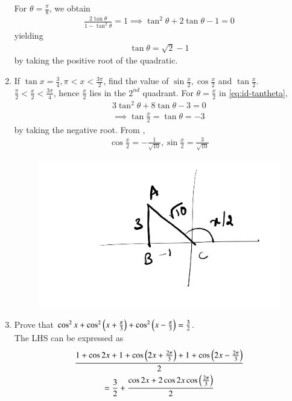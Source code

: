 \begin{enumerate}[label=\thesubsection.\arabic*,ref=\thesubsection.\theenumi,itemsep=1ex]
For $\theta = \frac{\pi}{8}$,  we obtain
\begin{align}
	 \frac{2\tan \theta}{1-\tan^2\theta}=1
	 \implies 
	{\tan^2\theta}+{2\tan \theta}- 1=0
\end{align}
yielding
\begin{align}
	\tan \theta = \sqrt{2}-1 
\end{align}
by taking the positive root of the quadratic.
%
\item If $\tan x=\frac{3}{4}, \pi<x<\frac{3\pi}{2}$, find the value of $\sin\frac{x}{2},\cos\frac{x}{2}$ and $\tan\frac{x}{2}$.
%
	\\
	\solution $ \frac{\pi}{2}<\frac{x}{2} <\frac{3\pi}{4} $, hence $\frac{x}{2}$
	lies in the $2^{nd}$
	quadrant.
%
	For $\theta = \frac{x}{2}$
	in
\eqref{eq:id-tantheta},
\begin{align}
	3{\tan^2\theta}+{8\tan \theta}- {3}=0
	\\
	\implies
	\tan\frac{x}{2}=\tan \theta = -3
\end{align}
by taking the negative root.
From
	,	
\begin{align}
	\cos \frac{x}{2} = -\frac{1}{\sqrt{10}},
	\sin\frac{x}{2} = \frac{3}{\sqrt{10}}
\end{align}
\begin{figure}[H]
	\begin{center}
		{\includegraphics[width=0.6\columnwidth]{figs/ncert/id/3.png}}
	\end{center}
	\caption{}
	\label{fig:ncert-id-3}	
\end{figure}
\item Prove that
$\cos^{2}x+\cos^{2}\left(x+\frac{\pi}{3}\right)+\cos^{2}\left(x-\frac{\pi}{3}\right)=\frac{3}{2}$.
%
\\
\solution The LHS can be expressed as
\begin{multline}
	\frac{1 + \cos 2x + 1 + \cos\left(2x+\frac{2\pi}{3}\right)+ 1+\cos\left(2x-\frac{2\pi}{3}\right)}{2}
	\\
	=
	\frac{3}{2} +
	\frac{\cos 2x + 2\cos2x\cos \left(\frac{2\pi}{3}\right)}{2}
\end{multline}

\end{enumerate}
